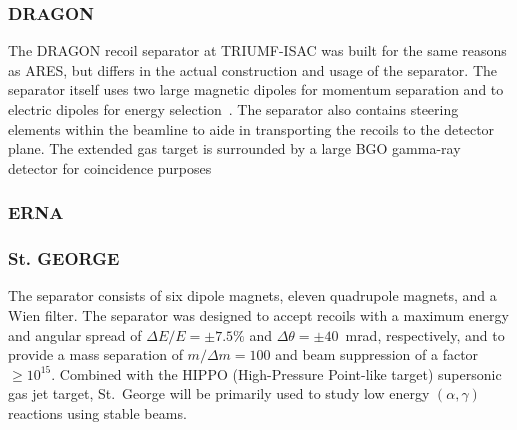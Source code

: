 \subsubsection{DRAGON}

The DRAGON recoil separator at TRIUMF-ISAC was built for the same reasons as ARES,
but differs in the actual construction and usage of the separator.
The separator
itself uses two large magnetic dipoles for momentum separation and to electric
dipoles for energy selection~\cite{Engel2005}. The separator also contains
steering elements within the beamline to aide in transporting the recoils to
the detector plane. The extended gas target is surrounded by a large BGO
gamma-ray detector for coincidence purposes

\subsubsection{ERNA}



\subsubsection{St. GEORGE}
The separator consists of six dipole magnets, eleven quadrupole magnets, and a
Wien filter. The separator was designed to accept recoils with a maximum
energy and angular spread of $\Delta E/E = \pm7.5\%$ and
$\Delta\theta = \pm40$~mrad, respectively, and to provide a mass separation
of $m/\Delta m = 100$ and beam suppression of a factor $\geq 10^{15}$. Combined
with the HIPPO (High-Pressure Point-like target) supersonic gas jet target,
St.\ George will be primarily used to study low energy $(\alpha,\gamma)$
reactions using stable beams.
